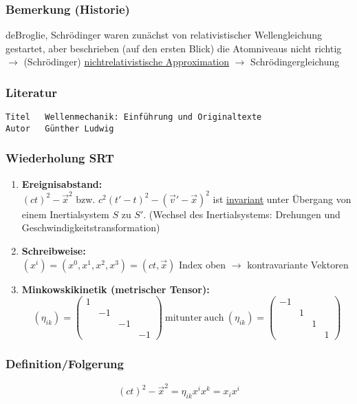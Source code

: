\documentclass[twoside,a4paper]{scrartcl}
\renewcommand{\1}{\mathds{1}}
\newcommand{\ra}{\rightarrow}
\begin{document}
\subsubsection*{Bemerkung (Historie)}
deBroglie, Schrödinger waren zunächst von relativistischer Wellengleichung gestartet, aber beschrieben (auf den ersten Blick) die Atomniveaus nicht richtig\\
$\ra$ (Schrödinger) \underline{nichtrelativistische Approximation} $\ra$ Schrödingergleichung
\subsubsection*{Literatur}
\begin{tiny}
\begin{verbatim}
Titel	Wellenmechanik: Einführung und Originaltexte
Autor	Günther Ludwig
\end{verbatim}
\end{tiny}


\subsubsection{Wiederholung SRT}
\begin{enumerate}
\item \textbf{Ereignisabstand:}\\
$(ct)^2-\vec x^2$ bzw. $c^2(t'-t)^2-(\vec v'-\vec x)^2$ ist \underline{invariant} unter Übergang von einem Inertialsystem $S$ zu $S'$. (Wechsel des Inertialsystems: Drehungen und Geschwindigkeitstransformation)
\item \textbf{Schreibweise:}\\
$(x^i)=(x^0,x^1,x^2,x^3)=(ct,\vec x)$ Index oben $\ra$ kontravariante Vektoren
\item \textbf{Minkowskikinetik (metrischer Tensor):}\\
$$(\eta_{ik})=\begin{pmatrix}1 \\ & -1 \\ & & -1 \\ & & & -1\end{pmatrix} \ \mathrm{mitunter \ auch \ } (\eta_{ik})=\begin{pmatrix}-1 \\ & 1 \\ & & 1 \\ & & & 1\end{pmatrix}$$
\end{enumerate}
\subsubsection*{Definition/Folgerung}
$$(ct)^2-\vec x^2= \eta_{ik} x^ix^k=x_ix^i$$
\end{document}
